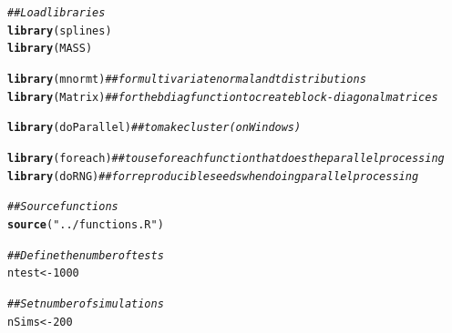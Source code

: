 \documentclass{article}\usepackage[]{graphicx}\usepackage[]{color}
\makeatletter
\newcommand{\hlnum}[1]{\textcolor[rgb]{0.686,0.059,0.569}{#1}}%
\newcommand{\hlstr}[1]{\textcolor[rgb]{0.192,0.494,0.8}{#1}}%
\newcommand{\hlcom}[1]{\textcolor[rgb]{0.678,0.584,0.686}{\textit{#1}}}%
\newcommand{\hlstd}[1]{\textcolor[rgb]{0.345,0.345,0.345}{#1}}%
\newcommand{\hlkwb}[1]{\textcolor[rgb]{0.69,0.353,0.396}{#1}}%
\newcommand{\hlkwd}[1]{\textcolor[rgb]{0.737,0.353,0.396}{\textbf{#1}}}%
\newenvironment{kframe}{%
 \def\at@end@of@kframe{}%
 \ifinner\ifhmode%
  \def\at@end@of@kframe{\end{minipage}}%
  \begin{minipage}{\columnwidth}%
 \fi\fi%
 \def\FrameCommand##1{\hskip\@totalleftmargin \hskip-\fboxsep
 \colorbox{shadecolor}{##1}\hskip-\fboxsep
     \hskip-\linewidth \hskip-\@totalleftmargin \hskip\columnwidth}%
 \MakeFramed {\advance\hsize-\width
   \@totalleftmargin\z@ \linewidth\hsize
   \@setminipage}}%
 {\par\unskip\endMakeFramed%
 \at@end@of@kframe}
\newenvironment{knitrout}{}{} %
\makeatother
\begin{document}
\begin{knitrout}
\color{fgcolor}\begin{kframe}
\begin{alltt}
\hlcom{## Load libraries}
\hlkwd{library}\hlstd{(splines)}
\hlkwd{library}\hlstd{(MASS)}

\hlkwd{library}\hlstd{(mnormt)} \hlcom{## for multivariate normal and t distributions}
\hlkwd{library}\hlstd{(Matrix)} \hlcom{##for the bdiag function to create block-diagonal matrices}

\hlkwd{library}\hlstd{(doParallel)} \hlcom{##to make cluster (on Windows)}
\end{alltt}


{\ttfamily\noindent\itshape\color{messagecolor}{\#\# Loading required package: foreach}}

{\ttfamily\noindent\itshape\color{messagecolor}{\#\# Loading required package: iterators}}

{\ttfamily\noindent\itshape\color{messagecolor}{\#\# Loading required package: parallel}}\begin{alltt}
\hlkwd{library}\hlstd{(foreach)} \hlcom{##to use foreach function that does the parallel processing}
\hlkwd{library}\hlstd{(doRNG)} \hlcom{##for reproducible seeds when doing parallel processing}
\end{alltt}


{\ttfamily\noindent\itshape\color{messagecolor}{\#\# Loading required package: rngtools}}

{\ttfamily\noindent\itshape\color{messagecolor}{\#\# Loading required package: pkgmaker}}

{\ttfamily\noindent\itshape\color{messagecolor}{\#\# Loading required package: registry}}

{\ttfamily\noindent\itshape\color{messagecolor}{\#\# \\\#\# Attaching package: 'pkgmaker'}}

{\ttfamily\noindent\itshape\color{messagecolor}{\#\# The following object is masked from 'package:base':\\\#\# \\\#\#\ \ \ \  isNamespaceLoaded}}\begin{alltt}
\hlcom{##Source functions}
\hlkwd{source}\hlstd{(}\hlstr{"../functions.R"}\hlstd{)}

\hlcom{## Define the number of tests}
\hlstd{ntest} \hlkwb{<-} \hlnum{1000}

\hlcom{## Set number of simulations}
\hlstd{nSims} \hlkwb{<-} \hlnum{200}
\end{alltt}
\end{kframe}
\end{knitrout}
\end{document}
